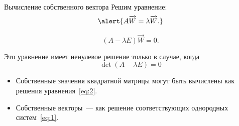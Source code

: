 \documentclass[unicode,11pt,notheorems,xcolor=table]{beamer}
\begin{document}
\begin{frame}{Вычисление собственного вектора}
    Решим уравнение:
    $$
    \alert{A\overrightarrow{W}=\lambda\overrightarrow{W}.}
    $$

    \begin{equation}
        (A-\lambda E)\overrightarrow{W}=0. \tag{$*$}
        \label{eq:1}
    \end{equation}
    
    Это уравнение имеет \alert{ненулевое} решение только в случае, когда 
    \begin{equation}
        \det(A-\lambda E)=0 \tag{$**$}
        \label{eq:2}
    \end{equation}

    \begin{itemize}
        \item Собственные значения квадратной матрицы  могут быть вычислены как решения уравнения~\eqref{eq:2}.
        \item Собственные векторы~--- как решение соответствующих однородных систем~\eqref{eq:1}.
    \end{itemize}
\end{frame}
\end{document}
